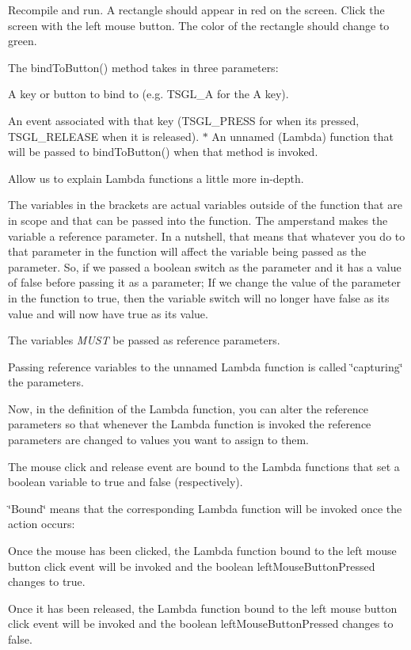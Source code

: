 Recompile and run. A rectangle should appear in red on the screen. Click the screen with the left mouse button. The color of the rectangle should change to green.

The bind\+To\+Button() method takes in three parameters\+:
\begin{DoxyItemize}
\item A key or button to bind to (e.\+g. T\+S\+G\+L\+\_\+\+A for the \textquotesingle{}A\textquotesingle{} key).
\item An event associated with that key (T\+S\+G\+L\+\_\+\+P\+R\+E\+S\+S for when it\textquotesingle{}s pressed, T\+S\+G\+L\+\_\+\+R\+E\+L\+E\+A\+S\+E when it is released). $\ast$ An unnamed (Lambda) function that will be passed to bind\+To\+Button() when that method is invoked.
\end{DoxyItemize}

Allow us to explain Lambda functions a little more in-\/depth.

The variables in the brackets are actual variables outside of the function that are in scope and that can be passed into the function. The amperstand makes the variable a reference parameter. In a nutshell, that means that whatever you do to that parameter in the function will affect the variable being passed as the parameter. So, if we passed a boolean {\ttfamily switch} as the parameter and it has a value of {\ttfamily false} before passing it as a parameter; If we change the value of the parameter in the function to {\ttfamily true}, then the variable {\ttfamily switch} will no longer have {\ttfamily false} as its value and will now have {\ttfamily true} as its value.

The variables {\itshape M\+U\+S\+T} be passed as reference parameters.

Passing reference variables to the unnamed Lambda function is called \char`\"{}capturing\char`\"{} the parameters.

Now, in the definition of the Lambda function, you can alter the reference parameters so that whenever the Lambda function is invoked the reference parameters are changed to values you want to assign to them.

The mouse click and release event are bound to the Lambda functions that set a boolean variable to true and false (respectively).

\char`\"{}\+Bound\char`\"{} means that the corresponding Lambda function will be invoked once the action occurs\+:


\begin{DoxyItemize}
\item Once the mouse has been clicked, the Lambda function bound to the left mouse button click event will be invoked and the boolean {\ttfamily left\+Mouse\+Button\+Pressed} changes to true.
\item Once it has been released, the Lambda function bound to the left mouse button click event will be invoked and the boolean {\ttfamily left\+Mouse\+Button\+Pressed} changes to false.
\end{DoxyItemize}

